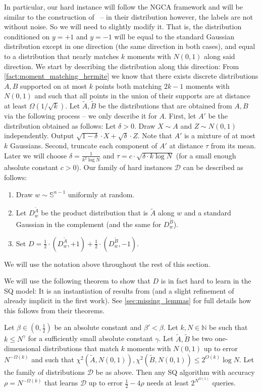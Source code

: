 \documentclass{theoretics}
\newcommand{\N}{\mathbb N}
\newcommand{\cD}{\mathcal D}
\renewcommand{\leq}{\leqslant}
\begin{document}
In particular, our hard instance will follow the NGCA framework and will be similar to the construction of~\cite{bubeck2019adversarial} -- in their distribution however, the labels are not without noise.
So we will need to slightly modify it.
That is, the distribution conditioned on $y = +1$ and $y = -1$ will be equal to the standard Gaussian distribution except in one direction (the same direction in both cases), and equal to a distribution that nearly matches $k$ moments with $N(0,1)$ along said direction.
We start by describing the distribution along this direction:
From \cref{fact:moment_matching_hermite} we know that there exists discrete distributions $A,B$ supported on at most $k$ points both matching $2k-1$ moments with $N(0,1)$ and such that all points in the union of their supports are at distance at least $\Omega(1/\sqrt{k})$.
Let $\tilde{A}, \tilde{B}$ be the distributions that are obtained from $A,B$ via the following process -- we only describe it for $A$.
First, let $A'$ be the distribution obtained as follows: Let $\delta > 0$. Draw $X \sim A$ and $Z \sim N(0,1)$ independently.
Output $\sqrt{1-\delta} \cdot X + \sqrt{\delta} \cdot Z$.
Note that $A'$ is a mixture of at most $k$ Gaussians.
Second, truncate each component of $A'$ at distance $\tau$ from its mean.
Later we will choose $\delta = \tfrac 1 {k^2 \log N}$ and $\tau = c \cdot \sqrt{\delta \cdot k  \log N}$ (for a small enough absolute constant $c > 0$).
Our family of hard instances $\cD$ can be described as follows:
\begin{enumerate}
    \item Draw $w \sim \mathbb{S}^{n-1}$ uniformly at random.
    \item Let $D_w^{\tilde{A}}$ be the product distribution that is $\tilde{A}$ along $w$ and a standard Gaussian in the complement (and the same for $D_w^{\tilde{B}}$).
    \item Set $D =\tfrac 1 2 \cdot(D_w^{\tilde{A}}, +1) + \tfrac 1 2 \cdot (D_w^{\tilde{B}}, -1)$.
\end{enumerate}
We will use the notation above throughout the rest of this section.

We will use the following theorem to show that $D$ is in fact hard to learn in the SQ model:
It is an instantiation of results from \cite{DK22} (and a slight refinement of \cite{NT22} already implicit in the first work).
See \cref{sec:missing_lemmas} for full details how this follows from their theorems.
\begin{theorem}
    \label{thm:sq_moment_matching}
    Let $\beta \in(0,\tfrac 1 2)$ be an absolute constant and $\beta' < \beta$.
    Let $k,N \in \N$ be such that $k \leq N^\gamma$ for a sufficiently small absolute constant $\gamma$.
    Let $\tilde{A},\tilde{B}$ be two one-dimensional distributions that match $k$ moments with $N(0,1)$ up to error $N^{-\Omega(k)}$ and such that $\chi^2(\tilde{A},N(0,1)),\chi^2(\tilde{B},N(0,1)) \leq 2^{O(k)} \log N$.
    Let the family of distributions $\cD$ be as above.
    Then any SQ algorithm with accuracy $\rho = N^{-\Omega(k)}$ that learns $\cD$ up to error $\tfrac 1 2 - 4 \rho$ needs at least $2^{N^{\Omega(1)}}$ queries.
\end{theorem}
\end{document}
